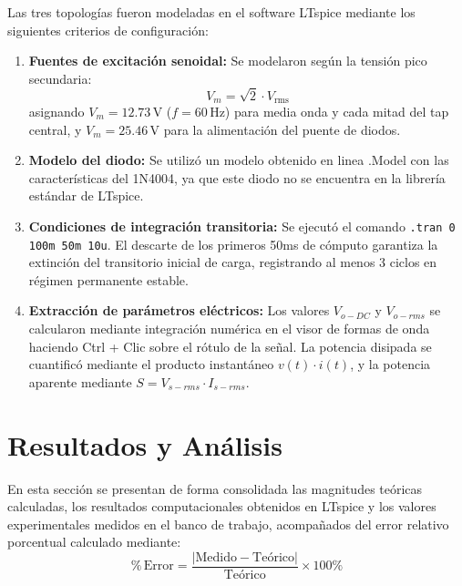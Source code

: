 Las tres topologías fueron modeladas en el software LTspice mediante los siguientes criterios de configuración:
\begin{enumerate}
    \item \textbf{Fuentes de excitación senoidal:} Se modelaron según la tensión pico secundaria:
    \begin{equation}
        V_m = \sqrt{2} \cdot V_{\mathrm{rms}}
    \end{equation}
    asignando $V_m = 12.73\,\mathrm{V}$ ($f = 60\,\mathrm{Hz}$) para media onda y cada mitad del tap central, y $V_m = 25.46\,\mathrm{V}$ para la alimentación del puente de diodos.
    \item \textbf{Modelo del diodo:} Se utilizó un modelo obtenido en linea .Model con las características del 1N4004, ya que este diodo no se encuentra en la librería estándar de LTspice.
    \item \textbf{Condiciones de integración transitoria:} Se ejecutó el comando \texttt{.tran 0 100m 50m 10u}. El descarte de los primeros 50ms de cómputo garantiza la extinción del transitorio inicial de carga, registrando al menos 3 ciclos en régimen permanente estable.
    \item \textbf{Extracción de parámetros eléctricos:} Los valores $V_{o-DC}$ y $V_{o-rms}$ se calcularon mediante integración numérica en el visor de formas de onda haciendo Ctrl + Clic sobre el rótulo de la señal. La potencia disipada se cuantificó mediante el producto instantáneo $v(t) \cdot i(t)$, y la potencia aparente mediante $S = V_{s-rms} \cdot I_{s-rms}$.
\end{enumerate}



\section{Resultados y Análisis}

En esta sección se presentan de forma consolidada las magnitudes teóricas calculadas, los resultados computacionales obtenidos en LTspice y los valores experimentales medidos en el banco de trabajo, acompañados del error relativo porcentual calculado mediante:
\begin{equation}
    \%\,\mathrm{Error} = \frac{|\mathrm{Medido} - \mathrm{Teórico}|}{\mathrm{Teórico}} \times 100\%
\end{equation}

